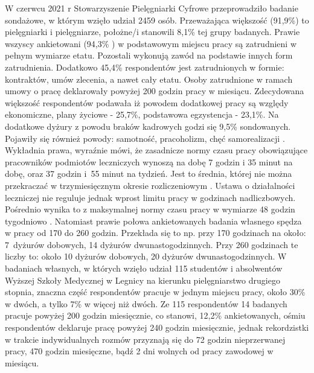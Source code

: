 \documentclass[a4paper,12pt,twoside,openright]{mwrep}
\begin{document}
W czerwcu 2021 r Stowarzyszenie Pielęgniarki Cyfrowe przeprowadziło badanie sondażowe, w którym wzięło udział 2459 osób. Przeważająca większość (91,9\%)  to pielęgniarki i pielęgniarze,  położne/i   stanowili 8,1\% tej grupy badanych.  Prawie wszyscy ankietowani (94,3\%  ) w podstawowym miejscu pracy  są zatrudnieni  w pełnym wymiarze etatu. Pozostali wykonują zawód na podstawie innych form zatrudnienia.  Dodatkowo 45,4\%  respondentów  jest zatrudnionych w formie: kontraktów, umów zlecenia, a nawet cały etatu.  Osoby zatrudnione w ramach umowy o pracę deklarowały powyżej 200 godzin pracy w miesiącu.  Zdecydowana większość respondentów podawała iż powodem dodatkowej pracy są względy ekonomiczne, plany życiowe - 25,7\%,  podstawowa egzystencja -  23,1\%.  Na dodatkowe dyżury z powodu braków kadrowych godzi się  9,5\% sondowanych.  Pojawiły się również powody: samotność, pracoholizm, chęć samorealizacji \cite{cyfrowe}. Wykładnia prawa, wyraźnie mówi, że zasadnicze normy czasu pracy obowiązujące pracowników podmiotów leczniczych wynoszą na dobę 7 godzin i 35 minut na dobę, oraz 37 godzin i~55 minut na tydzień. Jest to średnia, której nie można przekraczać w trzymiesięcznym okresie rozliczeniowym \cite{okres}. Ustawa o działalności leczniczej nie reguluje  jednak wprost limitu pracy w godzinach nadliczbowych. Pośrednio wynika to z maksymalnej normy czasu pracy w wymiarze 48 godzin tygodniowo \cite{klauzula}. Natomiast prawie połowa  ankietowanych badania własnego  spędza w pracy od 170 do 260 godzin.  Przekłada się  to np. przy 170 godzinach na około:  7~dyżurów dobowych, 14 dyżurów dwunastogodzinnych. Przy 260 godzinach te liczby to: około  10 dyżurów dobowych,  20 dyżurów dwunastogodzinnych. W badaniach własnych, w których wzięło udział 115 studentów i absolwentów Wyższej Szkoły Medycznej  w Legnicy na kierunku pielęgniarstwo drugiego stopnia, znaczna część respondentów pracuje w jednym miejscu pracy, około 30\% w dwóch, a tylko 7\% w więcej niż dwóch.  Ze 115 respondentów  14 badanych  pracuje powyżej 200 godzin miesięcznie, co stanowi, 12,2\% ankietowanych,   ośmiu respondentów deklaruje pracę powyżej  240 godzin miesięcznie, jednak rekordzistki w trakcie indywidualnych rozmów przyznają się do 72 godzin nieprzerwanej pracy, 470 godzin miesięczne, bądź 2 dni wolnych od pracy zawodowej w miesiącu.  
\end{document}
